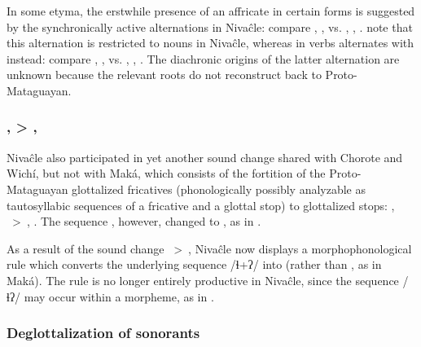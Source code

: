 In some etyma, the erstwhile presence of an affricate in certain forms is suggested by the synchronically active alternations in Nivaĉle: compare , ,  vs. , ,  \citep[45]{AnG15}. \citet[50]{LC20} note that this alternation is restricted to nouns in Nivaĉle, whereas in verbs  alternates with  instead: compare , ,  vs. , ,  \citep[50]{LC20}. The diachronic origins of the latter alternation are unknown because the relevant roots do not reconstruct back to Proto-Mataguayan.

\subsubsection{,  > , }\label{ni-glott-fric}

Nivaĉle also participated in yet another sound change shared with Chorote and Wichí, but not with Maká, which consists of the fortition of the Proto-Mataguayan glottalized fricatives (phonologically possibly analyzable as tautosyllabic sequences of a fricative and a glottal stop) to glottalized stops: , ~>~, . The sequence , however, changed to , as in .

\begin{exe}
    \ex \foot
    \ex \arrowfok
    \ex \tornkf \label{ni-kf'-torn}
    \ex \femalebreastits
    \ex \skinits
    \ex \meatits
    \ex \juiceits
    \ex \urinateyou
    \ex \urineits
\end{exe}

As a result of the sound change ~>~, Nivaĉle now displays a morphophonological rule which converts the underlying sequence /ɬ+ʔ/ into  (rather than , as in Maká). The rule is no longer entirely productive in Nivaĉle, since the sequence /ɬʔ/ may occur within a morpheme, as in .

\subsubsection{Deglottalization of sonorants}\label{ni-deglottalization-sonorants}

